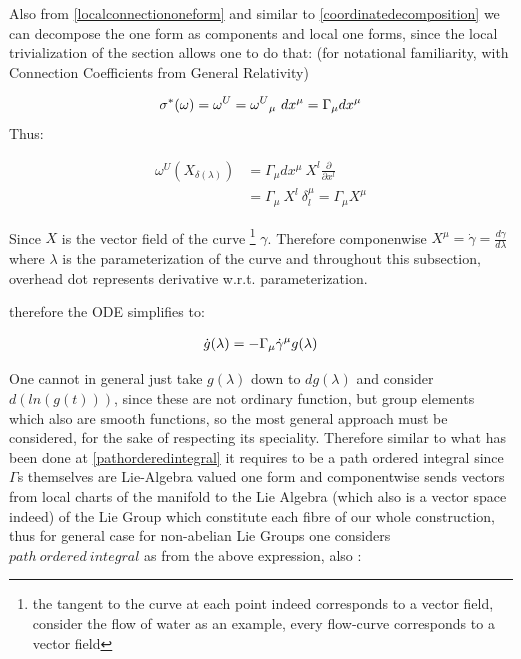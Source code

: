 \documentclass[8pt, twocoloumn]{article}
\begin{document}
Also from \ref{localconnectiononeform} and similar to \ref{coordinatedecomposition} we can decompose the one form as components and local one forms, since the local trivialization of the section allows one to do that: (for notational familiarity, with Connection Coefficients from General Relativity)

\begin{align}{\label{connectioncoeffeiahfpsfdsfdasgs}}
    \sigma^{*}(\omega) =  \omega^{U} = {\omega^{U}}_{\mu} \ dx^{\mu} = \Gamma_{\mu}dx^{\mu}
\end{align}
 Thus:

\begin{align}
    \omega^{U}(X_{\delta(\lambda)}) & =  {\Gamma_{\mu}} dx^{\mu} \ X^l \frac{\partial }{\partial x^l} \\
    &=  {\Gamma_{\mu}} \ X^l \ \delta^{\mu}_l = {\Gamma_{\mu}} X^{\mu}
\end{align}

Since $X$ is the vector field of the curve \footnote{the tangent to the curve at each point indeed corresponds to a vector field, consider the flow of water as an example, every flow-curve corresponds to a vector field} $\gamma$. Therefore componenwise $X^{\mu} = \dot{\gamma} = \frac{d \gamma}{d\lambda}$ where $\lambda$ is the parameterization of the curve and throughout this subsection, overhead dot represents derivative w.r.t. parameterization.

therefore the ODE simplifies to: 

\begin{align}{\label{veryeryimp}}
\dot{g}(\lambda) = - \Gamma_{\mu} \dot{\gamma}^{\mu} g(\lambda)
\end{align}

One cannot in general just take $g(\lambda)$ down to $dg(\lambda)$ and consider $d(ln(g(t)))$, since these are not ordinary function, but group elements which also are smooth functions, so the most general approach must be considered, for the sake of respecting its speciality. Therefore similar to what has been done at \ref{pathorderedintegral} it requires to be a path ordered integral since $\Gamma$s themselves are Lie-Algebra valued one form and componentwise sends vectors from local charts of the manifold to the Lie Algebra (which also is a vector space indeed) of the Lie Group which constitute each fibre of our whole construction, thus for general case for non-abelian Lie Groups one considers $path \ ordered \ integral$ as from the above expression, also :
\end{document}
